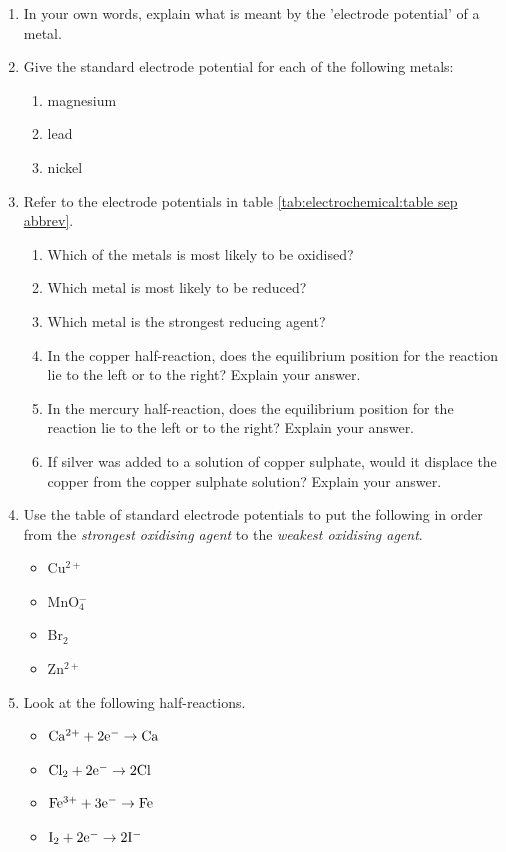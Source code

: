 \clearpage

{
\begin{enumerate}
\item{In your own words, explain what is meant by the 'electrode potential' of a metal.}
\item{Give the standard electrode potential for each of the following metals:
	\begin{enumerate}
	\item{magnesium}
	\item{lead}
	\item{nickel}
	\end{enumerate}}
\item{Refer to the electrode potentials in table \ref{tab:electrochemical:table sep abbrev}.
	\begin{enumerate}
	\item{Which of the metals is most likely to be oxidised?}
	\item{Which metal is most likely to be reduced?}
	\item{Which metal is the strongest reducing agent?}
	\item{In the copper half-reaction, does the equilibrium position for the reaction lie to the left or to the right? Explain your answer.}
	\item{In the mercury half-reaction, does the equilibrium position for the reaction lie to the left or to the right? Explain your answer.}
	\item{If silver was added to a solution of copper sulphate, would it displace the copper from the copper sulphate solution? Explain your answer.}
	\end{enumerate}}
\item{Use the table of standard electrode potentials to put the following in order from the \textit{strongest oxidising agent} to the \textit{weakest oxidising agent}.
	\begin{itemize}
	\item{Cu$^{2+}$}
	\item{MnO$_{4}^{-}$}
	\item{Br$_{2}$}
	\item{Zn$^{2+}$}
	\end{itemize}}
\item{Look at the following half-reactions.
	\begin{itemize}
	\item{$\rm{Ca^{2+} + 2e^{-} \rightarrow Ca}$}
	\item{$\rm{Cl_{2} + 2e^{-} \rightarrow 2Cl}$}
	\item{$\rm{Fe^{3+} + 3e^{-} \rightarrow Fe}$}
	\item{$\rm{I_{2} + 2e^{-} \rightarrow 2I^{-}}$}
 	\end{itemize}

}
\end{enumerate}}
